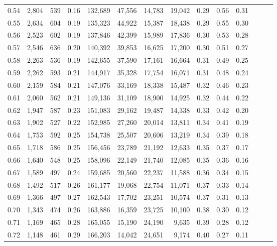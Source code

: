 \begin{tabular}{rrrrrrrrrrrrrr}
0.54 &  2,804 &  539 &  0.16 &  132,689 &   47,556 &  14,783 &  19,042 &  0.29 &  0.56 &      0.31 \\
0.55 &  2,634 &  604 &  0.19 &  135,323 &   44,922 &  15,387 &  18,438 &  0.29 &  0.55 &      0.30 \\
0.56 &  2,523 &  602 &  0.19 &  137,846 &   42,399 &  15,989 &  17,836 &  0.30 &  0.53 &      0.28 \\
0.57 &  2,546 &  636 &  0.20 &  140,392 &   39,853 &  16,625 &  17,200 &  0.30 &  0.51 &      0.27 \\
0.58 &  2,263 &  536 &  0.19 &  142,655 &   37,590 &  17,161 &  16,664 &  0.31 &  0.49 &      0.25 \\
0.59 &  2,262 &  593 &  0.21 &  144,917 &   35,328 &  17,754 &  16,071 &  0.31 &  0.48 &      0.24 \\
0.60 &  2,159 &  584 &  0.21 &  147,076 &   33,169 &  18,338 &  15,487 &  0.32 &  0.46 &      0.23 \\
0.61 &  2,060 &  562 &  0.21 &  149,136 &   31,109 &  18,900 &  14,925 &  0.32 &  0.44 &      0.22 \\
0.62 &  1,947 &  587 &  0.23 &  151,083 &   29,162 &  19,487 &  14,338 &  0.33 &  0.42 &      0.20 \\
0.63 &  1,902 &  527 &  0.22 &  152,985 &   27,260 &  20,014 &  13,811 &  0.34 &  0.41 &      0.19 \\
0.64 &  1,753 &  592 &  0.25 &  154,738 &   25,507 &  20,606 &  13,219 &  0.34 &  0.39 &      0.18 \\
0.65 &  1,718 &  586 &  0.25 &  156,456 &   23,789 &  21,192 &  12,633 &  0.35 &  0.37 &      0.17 \\
0.66 &  1,640 &  548 &  0.25 &  158,096 &   22,149 &  21,740 &  12,085 &  0.35 &  0.36 &      0.16 \\
0.67 &  1,589 &  497 &  0.24 &  159,685 &   20,560 &  22,237 &  11,588 &  0.36 &  0.34 &      0.15 \\
0.68 &  1,492 &  517 &  0.26 &  161,177 &   19,068 &  22,754 &  11,071 &  0.37 &  0.33 &      0.14 \\
0.69 &  1,366 &  497 &  0.27 &  162,543 &   17,702 &  23,251 &  10,574 &  0.37 &  0.31 &      0.13 \\
0.70 &  1,343 &  474 &  0.26 &  163,886 &   16,359 &  23,725 &  10,100 &  0.38 &  0.30 &      0.12 \\
0.71 &  1,169 &  465 &  0.28 &  165,055 &   15,190 &  24,190 &   9,635 &  0.39 &  0.28 &      0.12 \\
0.72 &  1,148 &  461 &  0.29 &  166,203 &   14,042 &  24,651 &   9,174 &  0.40 &  0.27 &      0.11 \\

\end{tabular}
